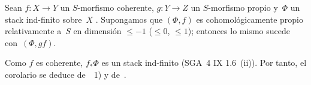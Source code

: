
\begin{corollaire}
\label{XIII.1.8}
Sean $f\colon X\to Y$ un $S$-morfismo coherente, $g\colon Y\to Z$ un
$S$-morfismo propio y~$\Phi$ un stack ind-finito sobre~$X$
\textup{\cite[VII 2.2.1]{XIII.2}}. Supongamos que $(\Phi,f)$ es
cohomológicamente propio relativamente a~$S$ en dimensión
$\leqslant -1$ (\resp $\leqslant 0$, \resp $\leqslant 1$); entonces
lo mismo sucede con~$(\Phi,gf)$.
\end{corollaire}

Como $f$ es coherente, $f_*\Phi$ es un stack ind-finito (SGA~4 IX
1.6~(ii)). Por tanto, el corolario se deduce de~~1)
y de~.
